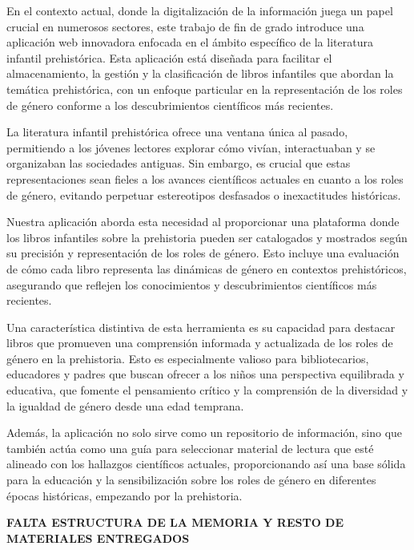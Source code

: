 En el contexto actual, donde la digitalización de la información juega un papel crucial en numerosos sectores, este trabajo de fin de grado introduce una aplicación web innovadora enfocada en el ámbito específico de la literatura infantil prehistórica. Esta aplicación está diseñada para facilitar el almacenamiento, la gestión y la clasificación de libros infantiles que abordan la temática prehistórica, con un enfoque particular en la representación de los roles de género conforme a los descubrimientos científicos más recientes.

La literatura infantil prehistórica ofrece una ventana única al pasado, permitiendo a los jóvenes lectores explorar cómo vivían, interactuaban y se organizaban las sociedades antiguas. Sin embargo, es crucial que estas representaciones sean fieles a los avances científicos actuales en cuanto a los roles de género, evitando perpetuar estereotipos desfasados o inexactitudes históricas.

Nuestra aplicación aborda esta necesidad al proporcionar una plataforma donde los libros infantiles sobre la prehistoria pueden ser catalogados y mostrados según su precisión y representación de los roles de género. Esto incluye una evaluación de cómo cada libro representa las dinámicas de género en contextos prehistóricos, asegurando que reflejen los conocimientos y descubrimientos científicos más recientes.

Una característica distintiva de esta herramienta es su capacidad para destacar libros que promueven una comprensión informada y actualizada de los roles de género en la prehistoria. Esto es especialmente valioso para bibliotecarios, educadores y padres que buscan ofrecer a los niños una perspectiva equilibrada y educativa, que fomente el pensamiento crítico y la comprensión de la diversidad y la igualdad de género desde una edad temprana.

Además, la aplicación no solo sirve como un repositorio de información, sino que también actúa como una guía para seleccionar material de lectura que esté alineado con los hallazgos científicos actuales, proporcionando así una base sólida para la educación y la sensibilización sobre los roles de género en diferentes épocas históricas, empezando por la prehistoria.



\textbf{FALTA ESTRUCTURA DE LA MEMORIA Y RESTO DE MATERIALES ENTREGADOS}
